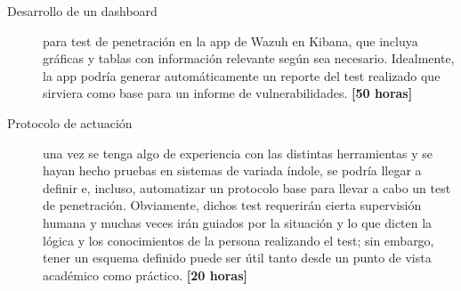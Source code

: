\begin{description}
    \item [Desarrollo de un dashboard] para test de penetración en la app de Wazuh en Kibana, que incluya gráficas y tablas con información relevante según sea necesario. Idealmente, la app podría generar automáticamente un reporte del test realizado que sirviera como base para un informe de vulnerabilidades. \textbf{[50 horas]}
    \item [Protocolo de actuación] una vez se tenga algo de experiencia con las distintas herramientas y se hayan hecho pruebas en sistemas de variada índole, se podría llegar a definir e, incluso, automatizar un protocolo base para llevar a cabo un test de penetración. Obviamente, dichos test requerirán cierta supervisión humana y muchas veces irán guiados por la situación y lo que dicten la lógica y los conocimientos de la persona realizando el test; sin embargo, tener un esquema definido puede ser útil tanto desde un punto de vista académico como práctico. \textbf{[20 horas]}
    
\end{description}
